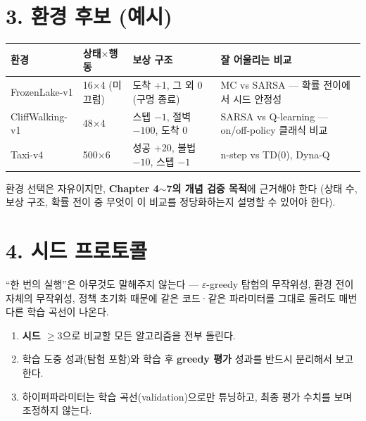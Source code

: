 \documentclass[12pt]{article}
\begin{document}
\section*{3. 환경 후보 (예시)}
\begin{center}
\small
\begin{tabular}{@{}lllp{4.4cm}@{}}
\toprule
환경 & 상태$\times$행동 & 보상 구조 & 잘 어울리는 비교 \\
\midrule
FrozenLake-v1 & 16$\times$4 (미끄럼) & 도착 +1, 그 외 0 (구멍 종료)
& MC vs SARSA --- 확률 전이에서 시드 안정성 \\
CliffWalking-v1 & 48$\times$4 & 스텝 $-1$, 절벽 $-100$, 도착 0 &
SARSA vs Q-learning --- on/off-policy 클래식 비교 \\
Taxi-v4 & 500$\times$6 & 성공 +20, 불법 $-10$, 스텝 $-1$ &
n-step vs TD(0), Dyna-Q \\
\bottomrule
\end{tabular}
\end{center}
\vspace{4pt}
환경 선택은 자유이지만, \textbf{Chapter 4$\sim$7의 개념 검증
목적}에 근거해야 한다 (상태 수, 보상 구조, 확률 전이 중 무엇이 이
비교를 정당화하는지 설명할 수 있어야 한다).

\section*{4. 시드 프로토콜}
``한 번의 실행''은 아무것도 말해주지 않는다 --- $\varepsilon$-greedy
탐험의 무작위성, 환경 전이 자체의 무작위성, 정책 초기화 때문에
같은 코드·같은 파라미터를 그대로 돌려도 매번 다른 학습 곡선이
나온다.
\begin{enumerate}
\item \textbf{시드 $\ge 3$}으로 비교할 모든 알고리즘을 전부
  돌린다.
\item 학습 도중 성과(탐험 포함)와 학습 후 \textbf{greedy 평가}
  성과를 반드시 분리해서 보고한다.
\item 하이퍼파라미터는 학습 곡선(validation)으로만 튜닝하고,
  최종 평가 수치를 보며 조정하지 않는다.
\end{enumerate}

\newpage
\end{document}

